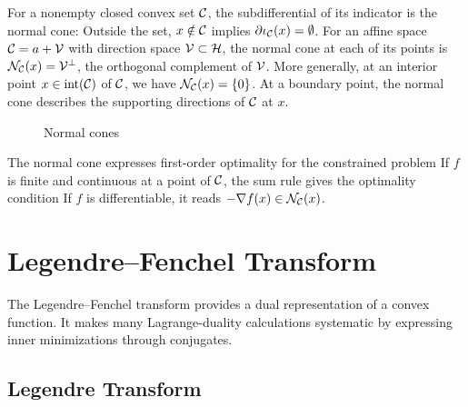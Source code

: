 For a nonempty closed convex set $\mathcal{C}$, the subdifferential of its indicator is the normal cone:
Outside the set, $x \notin \mathcal{C}$ implies $\partial  \iota_{\mathcal{C}}(x) = \emptyset$.
%
For an affine space $\mathcal{C} = a+\mathcal{V}$ with direction space $\mathcal{V} \subset \mathcal{H}$, the normal cone at each of its points is $\mathcal{N}_{\mathcal{C}}(x)=\mathcal{V}^\bot$, the orthogonal complement of $\mathcal{V}$. More generally, at an interior point $x \in \operatorname{int}(\mathcal{C})$ of $\mathcal{C}$, we have $\mathcal{N}_{\mathcal{C}}(x)=\{0\}$. At a boundary point, the normal cone describes the supporting directions of $\mathcal{C}$ at $x$.






\begin{figure}[tbp]
\centering
{}
\caption{Normal cones}
\label{fig-review-convex-analysis-normal-cones}
\end{figure}
The normal cone expresses first-order optimality for the constrained problem
If $f$ is finite and continuous at a point of $\mathcal{C}$, the sum rule gives the optimality condition
If $f$ is differentiable, it reads $-\nabla f(x) \in \mathcal{N}_{\mathcal{C}}(x)$.



\section{Legendre--Fenchel Transform}

The Legendre--Fenchel transform provides a dual representation of a convex function. It makes many Lagrange-duality calculations systematic by expressing inner minimizations through conjugates.

\subsection{Legendre Transform}

